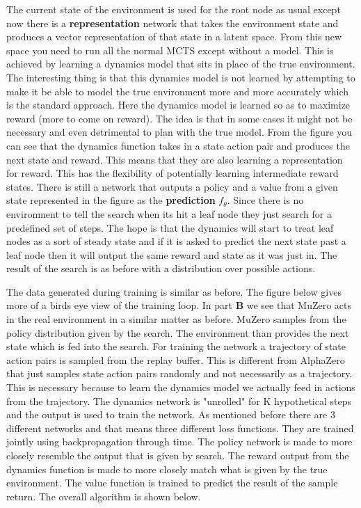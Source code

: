 The current state of the environment is used for the root node as usual except now there is a \textbf{representation} network that takes the environment state and produces a vector representation of that state in a latent space. From this new space you need to run all the normal MCTS except without a model. This is achieved by learning a dynamics model that sits in place of the true environment. The interesting thing is that this dynamics model is not learned by attempting to make it be able to model the true environment more and more accurately which is the standard approach. Here the dynamics model is learned so as to maximize reward (more to come on reward). The idea is that in some cases it might not be necessary and even detrimental to plan with the true model. From the figure you can see that the dynamics function takes in a state action pair and produces the next state and reward. This means that they are also learning a representation for reward. This has the flexibility of potentially learning intermediate reward states. There is still a network that outputs a policy and a value from a given state represented in the figure as the \textbf{prediction} $f_\theta$. Since there is no environment to tell the search when its hit a leaf node they just search for a predefined set of steps. The hope is that the dynamics will start to treat leaf nodes as a sort of steady state and if it is asked to predict the next state past a leaf node then it will output the same reward and state as it was just in. The result of the search is as before with a distribution over possible actions. 

The data generated during training is similar as before. The figure below gives more of a birds eye view of the training loop. In part \textbf{B} we see that MuZero acts in the real environment in a similar matter as before. MuZero samples from the policy distribution given by the search. The environment than provides the next state which is fed into the search. For training the network a trajectory of state action pairs is sampled from the replay buffer. This is different from AlphaZero that just samples state action pairs randomly and not necessarily as a trajectory. This is necessary because to learn the dynamics model we actually feed in actions from the trajectory. The dynamics network is "unrolled" for K hypothetical steps and the output is used to train the network. As mentioned before there are 3 different networks and that means three different loss functions. They are trained jointly using backpropagation through time. The policy network is made to more closely resemble the output that is given by search. The reward output from the dynamics function is made to more closely match what is given by the true environment. The value function is trained to predict the result of the sample return. The overall algorithm is shown below. 

